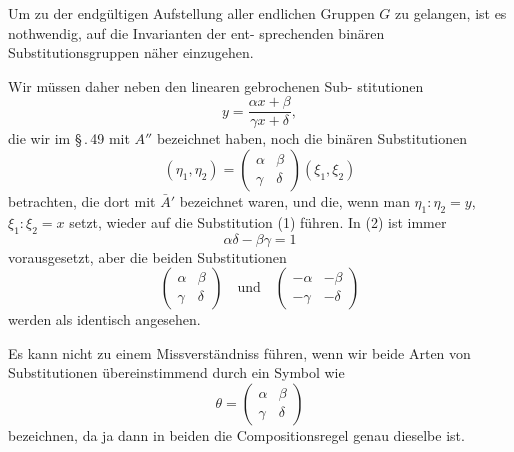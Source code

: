 \documentclass[12pt,a4paper]{article}
\theoremstyle{plain}
\theoremstyle{definition}
\theoremstyle{remark}
\begin{document}
Um zu der endg\"ultigen Aufstellung aller endlichen Gruppen
$G$ zu gelangen, ist es nothwendig, auf die Invarianten der ent-
sprechenden bin\"aren Substitutionsgruppen n\"aher einzugehen.

Wir m\"ussen daher neben den linearen gebrochenen Sub-
stitutionen
\begin{equation}\label{eq:54_1}
y = \frac{\alpha x + \beta}{\gamma x + \delta},\tag{1}
\end{equation}
die wir im \S\,.\,49 mit $A''$ bezeichnet haben, noch die bin\"aren
Substitutionen
\begin{equation}\label{eq:54_2}
(\eta_1, \eta_2) = \begin{pmatrix}\alpha & \beta\\ \gamma & \delta\end{pmatrix}(\xi_1, \xi_2)\tag{2}
\end{equation}
betrachten, die dort mit $\bar{A}'$ bezeichnet waren, und die, wenn man
$\eta_1 : \eta_2 = y$, $\xi_1 : \xi_2 = x$ setzt, wieder auf die Substitution (1)
f\"uhren. In (2) ist immer
\begin{equation}\label{eq:54_3}
\alpha\delta - \beta\gamma = 1\tag{3}
\end{equation}
vorausgesetzt, aber die beiden Substitutionen
\[
\begin{pmatrix}\alpha & \beta\\ \gamma & \delta\end{pmatrix}\quad\text{und}\quad
\begin{pmatrix}-\alpha & -\beta\\ -\gamma & -\delta\end{pmatrix}
\]
werden als identisch angesehen.

Es kann nicht zu einem Missverst\"andniss f\"uhren, wenn wir
beide Arten von Substitutionen \"ubereinstimmend durch ein
Symbol wie
\[
\theta = \begin{pmatrix}\alpha & \beta\\ \gamma & \delta\end{pmatrix}
\]
bezeichnen, da ja dann in beiden die Compositionsregel genau
dieselbe ist.
\end{document}
